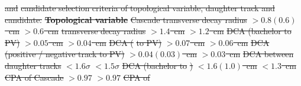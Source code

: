 \documentclass[ALICE,manyauthors]{cernphprep}
\providecommand{\DIFdel}[1]{{\protect\color{red}\sout{#1}}}                      %
\providecommand{\DIFdelbegin}{} %
\providecommand{\DIFdelFL}[1]{\DIFdel{#1}} %
\begin{document}
\DIFdelbegin %
{%
\DIFdelFL{and }%
\DIFdelFL{candidate selection criteria of topological variable, daughter track and candidate.}}
\textbf{\DIFdelFL{Topological variable}} %
\textbf{%
} %
\textbf{%
} %
\DIFdelFL{Cascade transverse decay radius }%
\DIFdelFL{$> 0.8(0.6)$~cm }%
\DIFdelFL{$> 0.6$~cm }%
\DIFdelFL{transverse decay radius }%
\DIFdelFL{$> 1.4$~cm     }%
\DIFdelFL{$> 1.2$~cm }%
\DIFdelFL{DCA (bachelor to PV)           }%
\DIFdelFL{$> 0.05$~cm    }%
\DIFdelFL{$> 0.04$~cm }%
\DIFdelFL{DCA (}%
\DIFdelFL{to PV)             }%
\DIFdelFL{$> 0.07$~cm    }%
\DIFdelFL{$> 0.06$~cm }%
\DIFdelFL{DCA (positive / negative track to PV) }%
\DIFdelFL{$> 0.04(0.03)$~cm }%
\DIFdelFL{$> 0.03$~cm  }%
\DIFdelFL{DCA between }%
\DIFdelFL{daughter tracks }%
\DIFdelFL{$< 1.6\sigma$     }%
\DIFdelFL{$< 1.5\sigma$ }%
\DIFdelFL{DCA (bachelor to }%
\DIFdelFL{) }%
\DIFdelFL{$< 1.6(1.0)$~cm }%
\DIFdelFL{$< 1.3$~cm }%
\DIFdelFL{CPA of Cascade          }%
\DIFdelFL{$> 0.97$       }%
\DIFdelFL{$> 0.97$  }%
\DIFdelFL{CPA of }%
\end{document}
